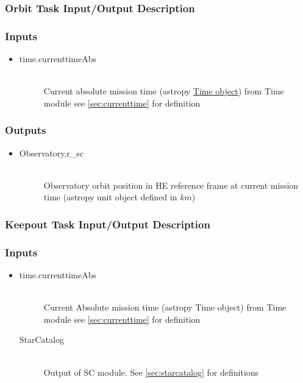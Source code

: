 \documentclass[cleanfoot]{asme2ej}
\begin{document}
\subsubsection{Orbit Task Input/Output Description} \label{sec:orbittask}

\subsubsection*{Inputs}
\begin{itemize}
    \item
    \begin{description}
        \item[time.currenttimeAbs] \hfill \\
        Current absolute mission time (astropy \href{http://astropy.readthedocs.org/en/latest/time/index.html}{Time object}) from Time module see \ref{sec:currenttime} for definition
    \end{description}
\end{itemize}

\subsubsection*{Outputs}
\begin{itemize}
    \item
    \begin{description}
        \item[Observatory.r\_sc] \hfill \\
        Observatory orbit position in HE reference frame at current mission time (astropy unit object defined in $ km $)
    \end{description}
\end{itemize}

\subsubsection{Keepout Task Input/Output Description} \label{sec:keepouttask}

\subsubsection*{Inputs}
\begin{itemize}
    \item
    \begin{description}
        \item[time.currenttimeAbs] \hfill \\
        Current Absolute mission time (astropy Time object) from Time module see \ref{sec:currenttime} for definition
        \item[StarCatalog] \hfill \\
        Output of SC module. See \ref{sec:starcatalog} for definitions
    \end{description}
\end{itemize}
\end{document}

